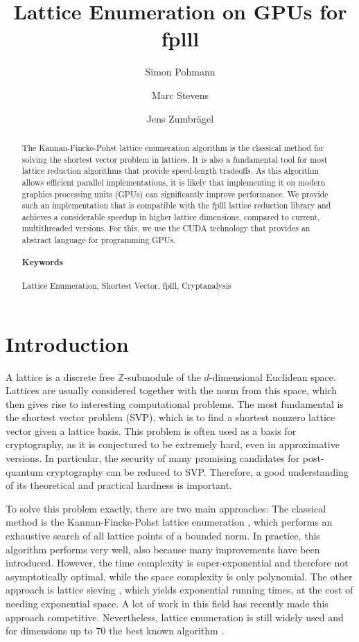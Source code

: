\documentclass{scrartcl}
\title{Lattice Enumeration on GPUs for fplll}
\author[1]{Simon Pohmann}
\author[2]{Marc Stevens}
\author[1]{Jens Zumbrägel}
\affil[1]{University of Passau}
\affil[2]{CWI Amsterdam}
\newcommand{\Z}{\mathbb{Z}}
\begin{document}
    \maketitle
    
    \begin{abstract}
    The Kannan-Fincke-Pohst lattice enumeration algorithm is the classical method for solving the shortest vector problem in lattices. It is also a fundamental tool for most lattice reduction algorithms that provide speed-length tradeoffs. 
    As this algorithm allows efficient parallel implementations, it is likely that implementing it on modern graphics processing units (GPUs) can significantly improve performance. 
    We provide such an implementation that is compatible with the fplll lattice reduction library \cite{fplll} and achieves a considerable speedup in higher lattice dimensions, compared to current, multithreaded versions.
    For this, we use the CUDA technology that provides an abstract language for programming GPUs.
    
    \paragraph{Keywords} Lattice Enumeration, Shortest Vector, fplll, Cryptanalysis
    \end{abstract}

    \section{Introduction}

    A lattice is a discrete free $\Z$-submodule of the $d$-dimensional Euclidean space. Lattices are usually considered together with the norm from this space, which then gives rise to interesting computational problems.
    The most fundamental is the shortest vector problem (SVP), which is to find a shortest nonzero lattice vector given a lattice basis. 
    This problem is often used as a basis for cryptography, as it is conjectured to be extremely hard, even in approximative versions.
    In particular, the security of many promising candidates for post-quantum cryptography can be reduced to SVP. 
    Therefore, a good understanding of its theoretical and practical hardness is important.

    To solve this problem exactly, there are two main approaches:
    The classical method is the Kannan-Fincke-Pohst lattice enumeration \cite{enum1, enum}, which performs an exhaustive search of all lattice points of a bounded norm. 
    In practice, this algorithm performs very well, also because many improvements have been introduced.
    However, the time complexity is super-exponential and therefore not asymptotically optimal, while the space complexity is only polynomial.
    The other approach is lattice sieving \cite{sieve}, which yields exponential running times, at the cost of needing exponential space. 
    A lot of work in this field has recently made this approach competitive.
    Nevertheless, lattice enumeration is still widely used and for dimensions up to 70 the best known algorithm \cite{g6k}.
\end{document}

